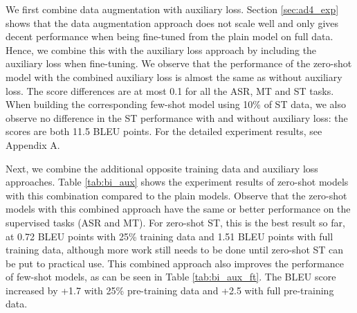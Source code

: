\documentclass[conference]{IEEEtran}
\begin{document}
	We first combine data augmentation with auxiliary loss. Section \ref{sec:ad4_exp} shows that the data augmentation approach does not scale well and only gives decent performance when being fine-tuned from the plain model on full data. Hence, we combine this with the auxiliary loss approach by including the auxiliary loss when fine-tuning. We observe that the performance of the zero-shot model with the combined auxiliary loss is almost the same as without auxiliary loss. The score differences are at most 0.1 for all the ASR, MT and ST tasks. When building the corresponding few-shot model using 10\% of ST data, we also observe no difference in the ST performance with and without auxiliary loss: the scores are both 11.5 BLEU points. For the detailed experiment results, see Appendix A.
	
	
	
	
	Next, we combine the additional opposite training data and auxiliary loss approaches. Table \ref{tab:bi_aux} shows the experiment results of zero-shot models with this combination compared to the plain models. Observe that the zero-shot models with this combined approach have the same or better performance on the supervised tasks (ASR and MT). %
	For zero-shot ST, this is the best result so far, at 0.72 BLEU points with 25\% training data and 1.51 BLEU points with full training data, although more work still needs to be done until zero-shot ST can be put to practical use. This combined approach also improves the performance of few-shot models, as can be seen in Table \ref{tab:bi_aux_ft}. The BLEU score increased by +1.7 with 25\% pre-training data and +2.5 with full pre-training data.
	
\end{document}
